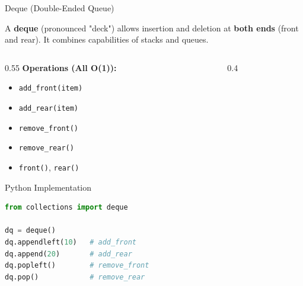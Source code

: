 \documentclass[aspectratio=169,xcolor=dvipsnames]{beamer}
\begin{document}
\begin{frame}[fragile]{Deque (Double-Ended Queue)}
  \begin{definition}
    A \textbf{deque} (pronounced "deck") allows insertion and deletion at \textbf{both ends} (front and rear). It combines capabilities of stacks and queues.
  \end{definition}

  \vspace{0.3cm}

  \begin{columns}
    \begin{column}{0.55\textwidth}
      \textbf{Operations (All O(1)):}
      \begin{itemize}
        \item \texttt{add\_front(item)}
        \item \texttt{add\_rear(item)}
        \item \texttt{remove\_front()}
        \item \texttt{remove\_rear()}
        \item \texttt{front()}, \texttt{rear()}
      \end{itemize}

      \vspace{0.3cm}

      \begin{exampleblock}{Python Implementation}
        \begin{lstlisting}[language=Python,basicstyle=\tiny\ttfamily]
from collections import deque

dq = deque()
dq.appendleft(10)   # add_front
dq.append(20)       # add_rear
dq.popleft()        # remove_front
dq.pop()            # remove_rear
        \end{lstlisting}
      \end{exampleblock}
    \end{column}
    \begin{column}{0.4\textwidth}
\end{column}
\end{columns}
\end{frame}
\end{document}
